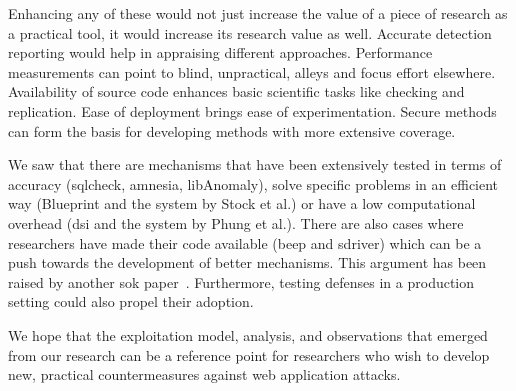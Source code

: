 \documentclass[conference]{IEEEtran}
\begin{document}
Enhancing any of these would not just increase the value of a piece of
research as a practical tool, it would increase its research value as
well. Accurate detection reporting would help in appraising different
approaches. Performance measurements can point to blind, unpractical,
alleys and focus effort elsewhere. Availability of source code
enhances basic scientific tasks like checking and replication. Ease of
deployment brings ease of experimentation. Secure methods can form the
basis for developing methods with more extensive coverage.

We saw that there are mechanisms that have been extensively tested in
terms of accuracy ({\sc sqlc}heck, {\sc amnesia},
libAnomaly), solve specific problems in an efficient way (Blueprint
and the system by Stock et al.) or have a low computational overhead
({\sc dsi} and the system by Phung et al.). There are also cases where
researchers have made their code available ({\sc beep} and {\sc
  sd}river) which can be a push towards the development of better
mechanisms. This argument has been raised by another {\sc s}o{\sc k}
paper~\cite{SPWS13}. Furthermore, testing defenses in a production
setting could also propel their adoption.

We hope that the exploitation model, analysis, and observations that
emerged from our research can be a reference point for researchers who
wish to develop new, practical countermeasures against web application
attacks.






\end{document}
